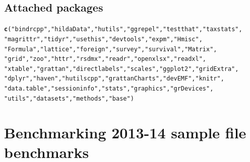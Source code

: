 \documentclass{grattan}\usepackage[]{graphicx}\usepackage[]{color}
\makeatletter
\newcommand{\hlstr}[1]{\textcolor[rgb]{0.192,0.494,0.8}{#1}}%
\newcommand{\hlstd}[1]{\textcolor[rgb]{0.345,0.345,0.345}{#1}}%
\newcommand{\hlkwd}[1]{\textcolor[rgb]{0.737,0.353,0.396}{\textbf{#1}}}%
\newenvironment{kframe}{%
 \def\at@end@of@kframe{}%
 \ifinner\ifhmode%
  \def\at@end@of@kframe{\end{minipage}}%
  \begin{minipage}{\columnwidth}%
 \fi\fi%
 \def\FrameCommand##1{\hskip\@totalleftmargin \hskip-\fboxsep
 \colorbox{shadecolor}{##1}\hskip-\fboxsep
     \hskip-\linewidth \hskip-\@totalleftmargin \hskip\columnwidth}%
 \MakeFramed {\advance\hsize-\width
   \@totalleftmargin\z@ \linewidth\hsize
   \@setminipage}}%
 {\par\unskip\endMakeFramed%
 \at@end@of@kframe}
\newenvironment{knitrout}{}{} %
\makeatother
\begin{document}
\section{Attached packages}
\begin{knitrout}
\color{fgcolor}\begin{kframe}
\begin{alltt}
\hlkwd{c}\hlstd{(}\hlstr{"bindrcpp"}\hlstd{,} \hlstr{"hildaData"}\hlstd{,} \hlstr{"hutils"}\hlstd{,} \hlstr{"ggrepel"}\hlstd{,} \hlstr{"testthat"}\hlstd{,} \hlstr{"taxstats"}\hlstd{,}
\hlstr{"magrittr"}\hlstd{,} \hlstr{"tidyr"}\hlstd{,} \hlstr{"usethis"}\hlstd{,} \hlstr{"devtools"}\hlstd{,} \hlstr{"expm"}\hlstd{,} \hlstr{"Hmisc"}\hlstd{,}
\hlstr{"Formula"}\hlstd{,} \hlstr{"lattice"}\hlstd{,} \hlstr{"foreign"}\hlstd{,} \hlstr{"survey"}\hlstd{,} \hlstr{"survival"}\hlstd{,} \hlstr{"Matrix"}\hlstd{,}
\hlstr{"grid"}\hlstd{,} \hlstr{"zoo"}\hlstd{,} \hlstr{"httr"}\hlstd{,} \hlstr{"rsdmx"}\hlstd{,} \hlstr{"readr"}\hlstd{,} \hlstr{"openxlsx"}\hlstd{,} \hlstr{"readxl"}\hlstd{,}
\hlstr{"xtable"}\hlstd{,} \hlstr{"grattan"}\hlstd{,} \hlstr{"directlabels"}\hlstd{,} \hlstr{"scales"}\hlstd{,} \hlstr{"ggplot2"}\hlstd{,} \hlstr{"gridExtra"}\hlstd{,}
\hlstr{"dplyr"}\hlstd{,} \hlstr{"haven"}\hlstd{,} \hlstr{"hutilscpp"}\hlstd{,} \hlstr{"grattanCharts"}\hlstd{,} \hlstr{"devEMF"}\hlstd{,} \hlstr{"knitr"}\hlstd{,}
\hlstr{"data.table"}\hlstd{,} \hlstr{"sessioninfo"}\hlstd{,} \hlstr{"stats"}\hlstd{,} \hlstr{"graphics"}\hlstd{,} \hlstr{"grDevices"}\hlstd{,}
\hlstr{"utils"}\hlstd{,} \hlstr{"datasets"}\hlstd{,} \hlstr{"methods"}\hlstd{,} \hlstr{"base"}\hlstd{)}
\end{alltt}
\end{kframe}
\end{knitrout}

\twocolumn
\chapter{Benchmarking 2013-14 sample file benchmarks}
\end{document}
